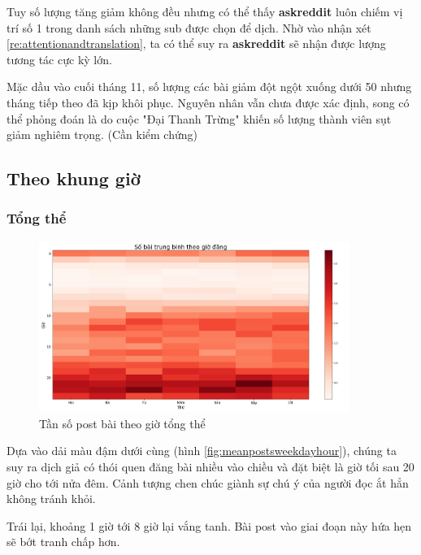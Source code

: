 \documentclass[10pt,a4paper]{article}
\begin{document}
Tuy số lượng tăng giảm không đều nhưng có thể thấy \textbf{askreddit} luôn chiếm vị trí số 1 trong danh sách những sub được chọn để dịch. Nhờ vào nhận xét \eqref{re:attentionandtranslation}, ta có thể suy ra \textbf{askreddit} sẽ nhận được lượng tương tác cực kỳ lớn.

Mặc dầu vào cuối tháng 11, số lượng các bài giảm đột ngột xuống dưới 50 nhưng tháng tiếp theo đã kịp khôi phục. Nguyên nhân vẫn chưa được xác định, song có thể phỏng đoán là do cuộc "Đại Thanh Trừng" khiến số lượng thành viên sụt giảm nghiêm trọng. (Cần kiểm chứng)

\subsection{Theo khung giờ}
\subsubsection{Tổng thể}
\begin{figure}[ht]
    \centering
    \includegraphics[width=0.9\textwidth]{img/MeanPostsWeekdayHour.png}
    \caption{Tần số post bài theo giờ tổng thể}
    \label{fig:meanpostsweekdayhour}
\end{figure}

Dựa vào dải màu đậm dưới cùng (hình \eqref{fig:meanpostsweekdayhour}), chúng ta suy ra dịch giả có thói quen đăng bài nhiều vào chiều và đặt biệt là giờ tối sau 20 giờ cho tới nửa đêm. Cảnh tượng chen chúc giành sự chú ý của người đọc ắt hẳn không tránh khỏi.

Trái lại, khoảng 1 giờ tới 8 giờ lại vắng tanh. Bài post vào giai đoạn này hứa hẹn sẽ bớt tranh chấp hơn.
\end{document}
